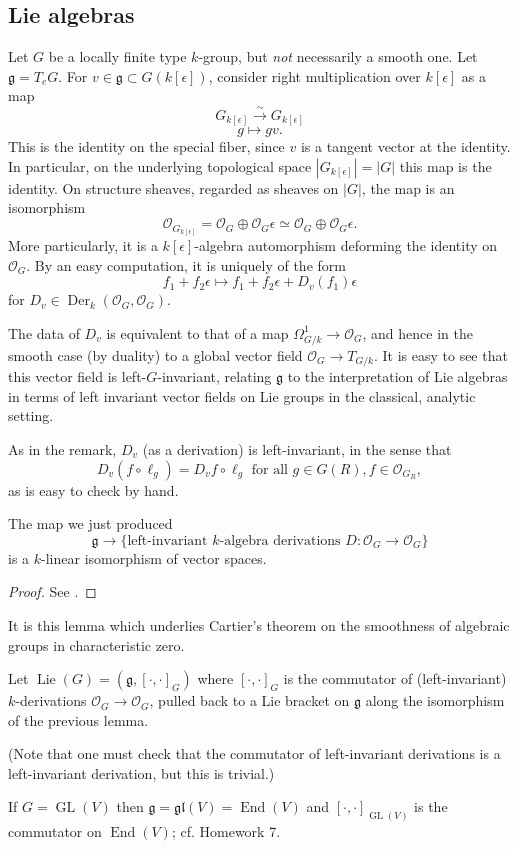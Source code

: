 \documentclass[10pt]{article}
\newcommand{\cO}{\mathcal{O}}
\newcommand{\GL}{\operatorname{GL}}
\newcommand{\Lie}{\operatorname{Lie}}
\renewcommand{\(}{\left(}
\renewcommand{\)}{\right)}
\newcommand{\End}{\operatorname{End}}
\newcommand{\Der}{\operatorname{Der}}
\newcommand{\g}{\mathfrak{g}}
\newcommand{\gl}{\mathfrak{gl}}
\numberwithin{thm}{subsection}
\begin{document}
\subsection{Lie algebras}
Let $G$ be a locally finite type $k$-group, but {\em not} necessarily a smooth one.
Let $\g=T_eG$.
For $v\in \g\subset G(k[\epsilon])$,
consider right multiplication over $k[\epsilon]$
as a map
\[G_{k[\epsilon]}\stackrel{\sim}{\to}G_{k[\epsilon]}\]
\[g\mapsto gv.\]
This is the identity on the special fiber,
since $v$ is a tangent vector at the identity.
In particular, on the underlying topological space
$|G_{k[\epsilon]}|=|G|$ this map is the identity.
On structure sheaves, regarded as sheaves on $|G|$,
the map
is an isomorphism
\[\cO_{G_{k[\epsilon]}}=\cO_G\oplus \cO_G\epsilon\simeq \cO_G\oplus \cO_G\epsilon.\]
More particularly, it is a $k[\epsilon]$-algebra automorphism deforming the identity
on $\cO_G$.
By an easy computation, it is uniquely of the form
\[f_1+f_2\epsilon\mapsto f_1+f_2\epsilon+D_v(f_1)\epsilon\]
for $D_v\in \Der_k(\cO_G,\cO_G)$.
\begin{rem}
The data of $D_v$ is equivalent to that of a map $\Omega^1_{G/k}\to \cO_G$,
and hence in the smooth case (by duality)
to a global vector field $\cO_G\to T_{G/k}$.
It is easy to see that this vector field is left-$G$-invariant,
relating $\g$ to the interpretation of Lie algebras
in terms of left invariant vector fields
on Lie groups in the classical, analytic setting.
\end{rem}
As in the remark, $D_v$ (as a derivation)
is left-invariant, in the sense
that 
\[D_v(f\circ \ell_g)=D_vf\circ \ell_g \mbox{ for all } g\in G(R),f\in \cO_{G_R},\]
as is easy to check by hand.
\begin{lem}
The map we just produced
\[\g\to \{\text{left-invariant $k$-algebra derivations $D:\cO_G\to\cO_G$}\}\]
is a $k$-linear isomorphism of vector spaces.
\end{lem}
\begin{proof} See \cite[A.7.1, A.7.2]{pred}.
\end{proof}
\begin{rem}
It is this lemma which underlies Cartier's theorem on the smoothness of algebraic groups in characteristic zero.
\end{rem}
\begin{defn}
Let $\Lie(G)=(\g,[\cdot ,\cdot ]_G)$
where $[\cdot , \cdot]_G$ is the commutator of (left-invariant) $k$-derivations
$\cO_G\to\cO_G$, pulled back to a Lie bracket on $\g$ along the isomorphism
of the previous lemma.
\end{defn}
(Note that one must check that the commutator of left-invariant derivations
is a left-invariant derivation, but this is trivial.)
\begin{ex}
If $G=\GL(V)$ then $\g=\gl(V)=\End(V)$
and $[\cdot ,\cdot ]_{\GL(V)}$ is the commutator on $\End(V)$;
cf. Homework 7.
\end{ex}
\end{document}
